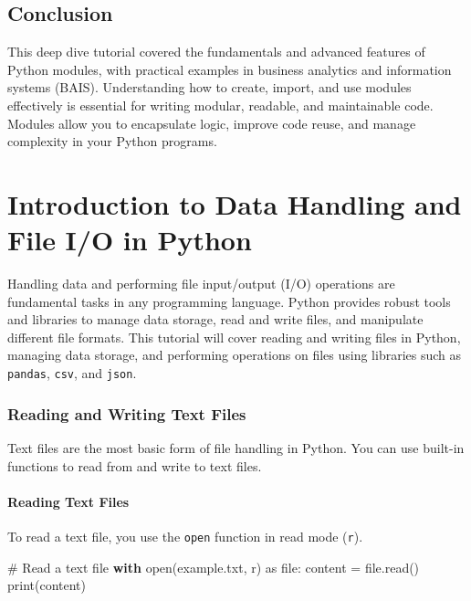 \documentclass[
  letterpaper,
  DIV=11,
  numbers=noendperiod]{scrreprt}
\newenvironment{Shaded}{\begin{snugshade}}{\end{snugshade}}
\newcommand{\BuiltInTok}[1]{\textcolor[rgb]{0.00,0.23,0.31}{#1}}
\newcommand{\CommentTok}[1]{\textcolor[rgb]{0.37,0.37,0.37}{#1}}
\newcommand{\ControlFlowTok}[1]{\textcolor[rgb]{0.00,0.23,0.31}{\textbf{#1}}}
\newcommand{\ImportTok}[1]{\textcolor[rgb]{0.00,0.46,0.62}{#1}}
\newcommand{\NormalTok}[1]{\textcolor[rgb]{0.00,0.23,0.31}{#1}}
\newcommand{\OperatorTok}[1]{\textcolor[rgb]{0.37,0.37,0.37}{#1}}
\newcommand{\StringTok}[1]{\textcolor[rgb]{0.13,0.47,0.30}{#1}}
\begin{document}
\section{Conclusion}\label{conclusion-7}

This deep dive tutorial covered the fundamentals and advanced features
of Python modules, with practical examples in business analytics and
information systems (BAIS). Understanding how to create, import, and use
modules effectively is essential for writing modular, readable, and
maintainable code. Modules allow you to encapsulate logic, improve code
reuse, and manage complexity in your Python programs.


\chapter{Introduction to Data Handling and File I/O in
Python}\label{introduction-to-data-handling-and-file-io-in-python}

Handling data and performing file input/output (I/O) operations are
fundamental tasks in any programming language. Python provides robust
tools and libraries to manage data storage, read and write files, and
manipulate different file formats. This tutorial will cover reading and
writing files in Python, managing data storage, and performing
operations on files using libraries such as \texttt{pandas},
\texttt{csv}, and \texttt{json}.

\subsection{Reading and Writing Text
Files}\label{reading-and-writing-text-files}

Text files are the most basic form of file handling in Python. You can
use built-in functions to read from and write to text files.

\subsubsection{Reading Text Files}\label{reading-text-files}

To read a text file, you use the \texttt{open} function in read mode
(\texttt{\textquotesingle{}r\textquotesingle{}}).

\begin{Shaded}
\begin{Highlighting}[]
\CommentTok{\# Read a text file}
\ControlFlowTok{with} \BuiltInTok{open}\NormalTok{(}\StringTok{\textquotesingle{}example.txt\textquotesingle{}}\NormalTok{, }\StringTok{\textquotesingle{}r\textquotesingle{}}\NormalTok{) }\ImportTok{as} \BuiltInTok{file}\NormalTok{:}
\NormalTok{    content }\OperatorTok{=} \BuiltInTok{file}\NormalTok{.read()}
    \BuiltInTok{print}\NormalTok{(content)}
\end{Highlighting}
\end{Shaded}
\end{document}
